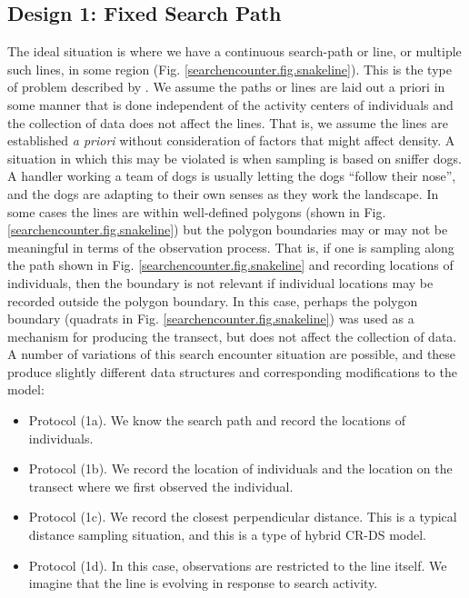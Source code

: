\subsection{Design 1: Fixed Search Path}
\label{searchencounter.sec.fixedpath}

The ideal situation is where we have a continuous search-path or
line, or multiple such lines, in some region
(Fig. \ref{searchencounter.fig.snakeline}). This is the type of
problem described by \citet{royle_etal:2011mee}. We assume the paths or
lines are laid out a priori in some manner that is done independent of
the activity centers of individuals and the collection of data does
not affect the lines.  That is, we assume the lines are established
{\it a priori} without consideration of factors that might affect
density. A situation in which this may be violated is when sampling is
based on sniffer dogs. A handler working a team of dogs is usually
letting the dogs ``follow their nose'', and the dogs are adapting to
their own senses as they work the landscape. 
In some cases the lines are within well-defined
polygons (shown in Fig. \ref{searchencounter.fig.snakeline}) but the
polygon boundaries may or may not be meaningful in terms of the
observation process. That is, if one is sampling along the path shown
in Fig. \ref{searchencounter.fig.snakeline} and recording locations of
individuals, then the boundary is not relevant if individual locations
may be recorded outside the polygon boundary. In this case, perhaps
the polygon boundary (quadrats in
Fig. \ref{searchencounter.fig.snakeline}) was used as a mechanism for
producing the transect, but does not affect the collection of data.  A
number of variations of this search encounter situation are possible,
and these produce slightly different data structures and corresponding
modifications to the model:
\begin{itemize}
 \item[] Protocol (1a). We know the search path and record the locations of individuals.
 \item[] Protocol (1b). We record the location of individuals and
   the location on the transect where we first observed the individual.
 \item[] Protocol (1c). We record
the closest perpendicular distance. This is a typical
   distance sampling situation, and this is a type of hybrid CR-DS model.
 \item[] Protocol (1d). In this case, observations are restricted to
   the line itself. We imagine that the line is evolving in response
   to search activity. 
 \end{itemize}


